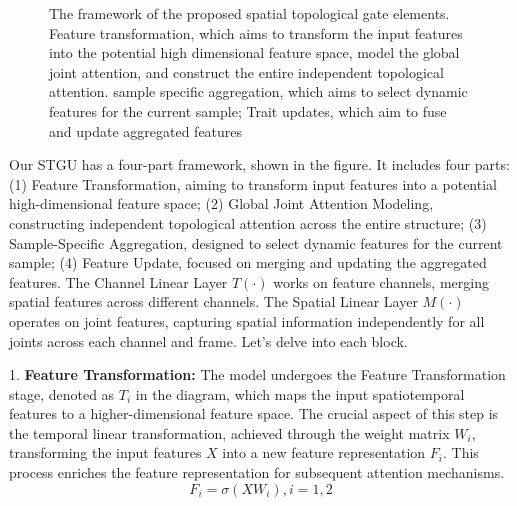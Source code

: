 \documentclass[conference,a4paper,english]{IEEEtran}[2015/08/26]
\begin{document}
\begin{figure}[!b]
  \centering

\caption{The framework of the proposed spatial topological gate elements. Feature transformation, which aims to transform the input features into the potential high dimensional feature space, model the global joint attention, and construct the entire independent topological attention. sample specific aggregation, which aims to select dynamic features for the current sample; Trait updates, which aim to fuse and update aggregated features}

\end{figure}



Our STGU has a four-part framework, shown in the figure. It includes four parts: (1) Feature Transformation,
 aiming to transform input features into a potential high-dimensional feature space; 
 (2) Global Joint Attention Modeling, constructing independent topological attention across 
 the entire structure; (3) Sample-Specific Aggregation, designed to select dynamic features for 
 the current sample; (4) Feature Update, focused on merging and updating the aggregated features. 
 The Channel Linear Layer \(T(\cdot)\) works on feature channels, merging spatial features across 
 different channels. The Spatial Linear Layer \(M(\cdot)\) operates on joint features, capturing 
 spatial information independently for all joints across each channel and frame. Let's delve into each block.

1. \textbf{Feature Transformation:} The model undergoes the Feature Transformation stage, 
denoted as \(T_i\) in the diagram, which maps the input spatiotemporal features to a higher-dimensional 
feature space. The crucial aspect of this step is the temporal linear transformation, 
achieved through the weight matrix \(W_i\), transforming the input features \(X\) into a new feature 
representation \(F_i\). This process enriches the feature representation for subsequent attention mechanisms.
   \[
   F_i = \sigma(XW_i),i=1,2 \tag{20}
   \]
\end{document}
